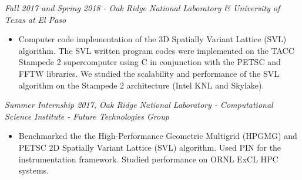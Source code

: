 \documentclass[margin]{res}
\begin{document}
\begin{resume}
{\sl Fall 2017 and Spring 2018 - Oak Ridge National Laboratory \& University of Texas at El Paso} \hfill  
\begin{itemize}
\item Computer code implementation of the 3D Spatially Variant Lattice (SVL) algorithm.
The SVL written program codes were implemented on the TACC Stampede 2 supercomputer using C in conjunction with the PETSC and FFTW libraries.
We studied the scalability and performance of the SVL algorithm on the Stampede 2 architecture (Intel KNL and Skylake).
\end{itemize}

{\sl Summer Internship 2017, Oak Ridge National Laboratory - Computational Science Institute - Future Technologies Group  }%
\begin{itemize}
\item Benchmarked the the High-Performance Geometric Multigrid (HPGMG) and PETSC 2D Spatially Variant Lattice (SVL) algorithm.
Used PIN for the instrumentation framework. Studied performance on ORNL ExCL HPC systems.
\end{itemize}


\end{resume}
\end{document}
